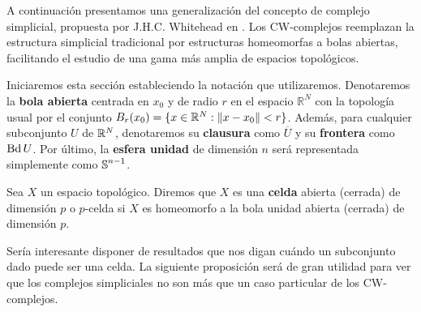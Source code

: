 A continuación presentamos una generalización del concepto de complejo
simplicial, propuesta por J.H.C. Whitehead en \cite{MR0030759}. Los CW-complejos
reemplazan la estructura simplicial tradicional por estructuras homeomorfas a bolas
abiertas, facilitando el estudio de una gama más amplia de espacios topológicos.

Iniciaremos esta sección estableciendo la notación que utilizaremos. Denotaremos
la \textbf{bola abierta} centrada en $x_{0}$ y de radio $r$ en el espacio
$\mathbb{R}^{N}$ con la topología usual por el conjunto
$B_{r}(x_{0}) = \{ x \in \mathbb{R}^{N} : \| x - x_{0} \| < r \}$. Además, para
cualquier subconjunto $U$ de $\mathbb{R}^{N}$, denotaremos su \textbf{clausura} como
$\overline{U}$ y su \textbf{frontera} como $\operatorname{Bd} U$. Por último, la \textbf{esfera
	unidad} de dimensión $n$ será representada simplemente como $\operatorname{\mathbb{S}}^{n-1}$.

\begin{definicion}
	Sea $X$ un espacio topológico. Diremos que $X$ es una \textbf{celda} abierta (cerrada)
	de dimensión $p$ o $p$-celda si $X$ es homeomorfo a la bola unidad abierta (cerrada)
	de dimensión $p$.
\end{definicion}

Sería interesante disponer de resultados que nos digan cuándo un subconjunto dado
puede ser una celda. La siguiente proposición será de gran utilidad para ver que los complejos
simpliciales no son más que un caso particular de los CW-complejos.

